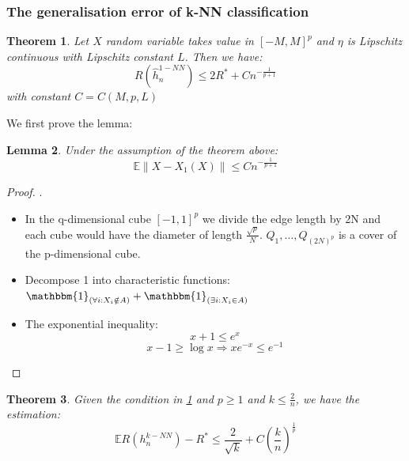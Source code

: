 \documentclass[a4paper,12pt, oneside, fleqn]{book}
\newtheorem{theorem}{Theorem}[section]
\newtheorem{lemma}[theorem]{Lemma}
\theoremstyle{definition}
\theoremstyle{remark}
\begin{document}
\subsubsection*{The generalisation error of k-NN classification}

\begin{theorem} \label{1-NN:UB}
Let $X$ random variable takes value in $[-M, M]^p$ and $\eta$ is Lipschitz continuous with Lipschitz constant $L$. Then we have:
	\begin{equation*}
		R(\hat{h}_n^{1-NN}) \leq 2 R^* + C n^{-\frac{1}{p+1}}
	\end{equation*}
	with constant $C = C(M, p, L)$
\end{theorem}

We first prove the lemma:
\begin{lemma}
	Under the assumption of the theorem above:
	\begin{equation*}
		\mathbb{E} \| X - X_1(X) \| \leq C n^{-\frac{1}{p + 1}}
	\end{equation*}
\end{lemma}

\begin{proof}.
	\begin{itemize}
		\item In the q-dimensional cube $[-1, 1]^p$ we divide the edge length by 2N and each cube would have the diameter of length $\frac{\sqrt{p}}{N}$. $Q_1, \dots, Q_{(2N)^p}$ is a cover of the p-dimensional cube.
		\item Decompose 1 into characteristic functions: $\mathbbm{1}_{(\forall i: X_i \notin A)} + \mathbbm{1}_{(\exists i:X_i \in A)} $
		\item The exponential inequality:
			\begin{equation*}
				x + 1 \leq e^x
			\end{equation*}
			\begin{equation*}
				x - 1 \geq \log x \Rightarrow x e^{-x} \leq e^{-1}
			\end{equation*}
	\end{itemize}
\end{proof}

\begin{theorem}
	Given the condition in \ref{1-NN:UB} and $p \geq 1$ and $k \leq \frac{2}{n}$, we have the estimation:
	\begin{equation*}
		\mathbb{E} R(h^{k-NN}_n) - R^* \leq \frac{2}{\sqrt{k}} + C(\frac{k}{n})^{\frac{1}{p}}
	\end{equation*}
\end{theorem}
\end{document}
